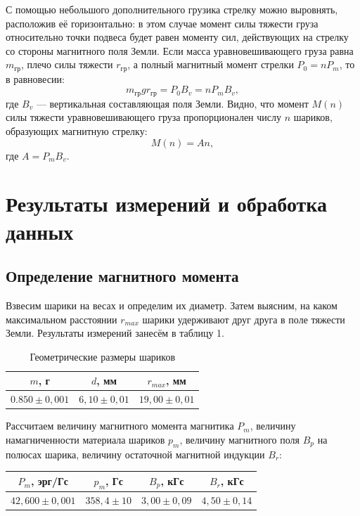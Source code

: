 \documentclass[a4paper]{article}
\theoremstyle{definition}
\theoremstyle{remark}
\begin{document}
С помощью небольшого дополнительного грузика стрелку можно выровнять, расположив её горизонтально: в этом случае момент силы тяжести груза относительно точки подвеса будет равен моменту сил, действующих на стрелку со стороны магнитного поля Земли. Если масса уравновешивающего груза равна $m_{\text{гр}}$, плечо силы тяжести $r_{\text{гр}}$, а полный магнитный момент стрелки $P_0 = nP_m$, то в равновесии: $$m_{\text{гр}}gr_{{\text{гр}}} = P_0B_v = nP_mB_v,$$ где $B_v$ --- вертикальная составляющая поля Земли. Видно, что момент $M(n)$ силы тяжести уравновешивающего груза пропорционален числу $n$ шариков, образующих магнитную стрелку: $$M(n) = An,$$ где $A = P_mB_v$.

\section{Результаты измерений и обработка данных}

\subsection{Определение магнитного момента}

Взвесим шарики на весах и определим их диаметр. Затем выясним, на каком максимальном расстоянии $r_{max}$ шарики удерживают друг друга в поле тяжести Земли. Результаты измерений занесём в таблицу 1.

\begin{table}[h!]
    \centering
    \begin{tabular}{|c|c|c|}
    \hline
    $m$, г            & $d$, мм          & $r_{max}$, мм      \\ \hline
    $0.850 \pm 0,001$ & $6,10 \pm 0,01$ & $19,00 \pm 0,01$ \\ \hline
    \end{tabular}
    \caption{Геометрические размеры шариков}
    \end{table}


Рассчитаем величину магнитного момента магнитика $P_m$, величину намагниченности материала шариков $p_m$, величину магнитного поля $B_p$ на полюсах шарика, величину остаточной магнитной индукции $B_r$: 

\begin{table}[h!]
    \centering
    \begin{tabular}{|c|c|c|c|}
    \hline
    $P_m$, эрг/Гс       & $p_m$, Гс      & $B_p$, кГс       & $B_r$, кГс      \\ \hline
    $42,600 \pm  0,001$ & $358,4 \pm 10$ & $3,00 \pm 0,09 $ & $4,50 \pm 0,14$ \\ \hline
    \end{tabular}
    \end{table}
\end{document}

